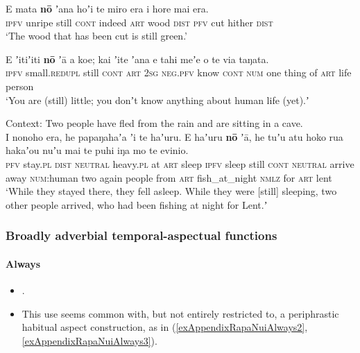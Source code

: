 \begin{exe}
	\ex\label{exAppendixRapaNui1}
	\gll E mata \textbf{nō} ʼana hoʼi te miro era i hore mai era.\\
	\textsc{ipfv} unripe still \textsc{cont} indeed \textsc{art} wood \textsc{dist} \textsc{pfv} cut hither \textsc{dist}\\
	\glt \lq The wood that has been cut is still green.'  \parencite[326]{Kieviet2017}
	
	\ex\label{exAppendixRapaNui2}
	\gll E ʼitiʼiti \textbf{nō} ʼā a koe; kai ʼite ʼana e tahi meʼe o te via taŋata.\\
\textsc{ipfv} small.\textsc{redupl} still \textsc{cont} \textsc{art} 2\textsc{sg} \textsc{neg}.\textsc{pfv} know \textsc{cont} \textsc{num} one thing of \textsc{art} life person\\
	\glt \lq You are (still) little; you donʼt know anything about human life (yet).ʼ \parencite[501]{Kieviet2017}
	
	\ex\label{exAppendixRapaNui3}
	Context: Two people have fled from the rain and are sitting in a cave.\\
	\gll I nonoho era, he papaŋahaʼa ʼi te haʼuru. E haʼuru \textbf{nō} ʼā, he tuʼu atu hoko rua hakaʼou nuʼu mai te puhi iŋa mo te evinio.\\
	\textsc{pfv} stay.\textsc{pl} \textsc{dist} \textsc{neutral} heavy.\textsc{pl} at \textsc{art} sleep \textsc{ipfv} sleep still \textsc{cont} \textsc{neutral} arrive away \textsc{num}:human two again people from \textsc{art} fish\_at\_night \textsc{nmlz} for \textsc{art} lent\\
\glt \lq While they stayed there, they fell asleep. While they were [still] sleeping, two other people arrived, who had been fishing at night for Lent.ʼ \parencite[588–589]{Kieviet2017}
\end{exe}

\subsubsection{Broadly adverbial temporal-aspectual functions}

\paragraph{Always}\label{appendixRapanuiAlways}
\begin{itemize}
	\item \textcite[132, 272]{Fuentes1960}.
	\item This use seems common with, but not entirely restricted to, a periphrastic habitual aspect construction, as in (\ref{exAppendixRapaNuiAlways2}, \ref{exAppendixRapaNuiAlways3}).
\end{itemize}

